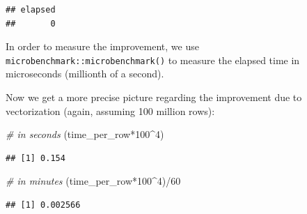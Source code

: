 \documentclass[
  12pt,
]{style/krantz}
\newenvironment{Shaded}{\begin{snugshade}}{\end{snugshade}}
\newcommand{\CommentTok}[1]{\textcolor[rgb]{0.56,0.35,0.01}{\textit{#1}}}
\newcommand{\DecValTok}[1]{\textcolor[rgb]{0.00,0.00,0.81}{#1}}
\newcommand{\FunctionTok}[1]{\textcolor[rgb]{0.00,0.00,0.00}{#1}}
\newcommand{\NormalTok}[1]{#1}
\newcommand{\OtherTok}[1]{\textcolor[rgb]{0.56,0.35,0.01}{#1}}
\newcommand{\SpecialCharTok}[1]{\textcolor[rgb]{0.00,0.00,0.00}{#1}}
\begin{document}
\begin{verbatim}
## elapsed 
##       0
\end{verbatim}

In order to measure the improvement, we use \texttt{microbenchmark::microbenchmark()} to measure the elapsed time in microseconds (millionth of a second).

\begin{Shaded}
\end{Shaded}

Now we get a more precise picture regarding the improvement due to vectorization (again, assuming 100 million rows):

\begin{Shaded}
\begin{Highlighting}[]
\CommentTok{\# in seconds}
\NormalTok{(time\_per\_row}\SpecialCharTok{*}\DecValTok{100}\SpecialCharTok{\^{}}\DecValTok{4}\NormalTok{) }
\end{Highlighting}
\end{Shaded}

\begin{verbatim}
## [1] 0.154
\end{verbatim}

\begin{Shaded}
\begin{Highlighting}[]
\CommentTok{\# in minutes}
\NormalTok{(time\_per\_row}\SpecialCharTok{*}\DecValTok{100}\SpecialCharTok{\^{}}\DecValTok{4}\NormalTok{)}\SpecialCharTok{/}\DecValTok{60} 
\end{Highlighting}
\end{Shaded}

\begin{verbatim}
## [1] 0.002566
\end{verbatim}
\end{document}
